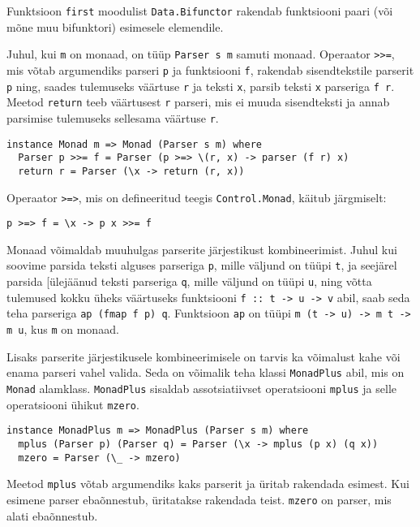 \documentclass[12pt]{article}
\begin{document}
        Funktsioon \verb!first! moodulist \verb!Data.Bifunctor! rakendab funktsiooni paari (või mõne muu bifunktori) esimesele elemendile.

        Juhul, kui \verb!m! on monaad, on tüüp \verb!Parser s m! samuti monaad. Operaator \verb!>>=!, mis võtab argumendiks parseri \verb!p! ja funktsiooni \verb!f!, rakendab sisendtekstile parserit \verb!p! ning, saades tulemuseks väärtuse \verb!r! ja teksti \verb!x!, parsib teksti \verb!x! parseriga \verb!f r!. Meetod \verb!return! teeb väärtusest \verb!r! parseri, mis ei muuda sisendteksti ja annab parsimise tulemuseks sellesama väärtuse \verb!r!.

        \begin{verbatim}instance Monad m => Monad (Parser s m) where
  Parser p >>= f = Parser (p >=> \(r, x) -> parser (f r) x)
  return r = Parser (\x -> return (r, x))\end{verbatim}

        Operaator \verb!>=>!, mis on defineeritud teegis \verb!Control.Monad!, käitub järgmiselt:

        \begin{verbatim}p >=> f = \x -> p x >>= f\end{verbatim}

        Monaad võimaldab muuhulgas parserite järjestikust kombineerimist. Juhul kui soovime parsida teksti alguses parseriga \verb!p!, mille väljund on tüüpi \verb!t!, ja seejärel parsida [ülejäänud teksti parseriga \verb!q!, mille väljund on tüüpi \verb!u!, ning võtta tulemused kokku üheks väärtuseks funktsiooni \verb!f :: t -> u -> v! abil, saab seda teha parseriga \verb!ap (fmap f p) q!. Funktsioon \verb!ap! on tüüpi \verb!m (t -> u) -> m t -> m u!, kus \verb!m! on monaad. 

        Lisaks parserite järjestikusele kombineerimisele on tarvis ka võimalust kahe või enama parseri vahel valida. Seda on võimalik teha klassi \verb!MonadPlus! abil, mis on \verb!Monad! alamklass. \verb!MonadPlus! sisaldab assotsiatiivset operatsiooni \verb!mplus! ja selle operatsiooni ühikut \verb!mzero!.

        \begin{verbatim}instance MonadPlus m => MonadPlus (Parser s m) where
  mplus (Parser p) (Parser q) = Parser (\x -> mplus (p x) (q x))
  mzero = Parser (\_ -> mzero)\end{verbatim}

        Meetod \verb!mplus! võtab argumendiks kaks parserit ja üritab rakendada esimest. Kui esimene parser ebaõnnestub, üritatakse rakendada teist. \verb!mzero! on parser, mis alati ebaõnnestub.
\end{document}
